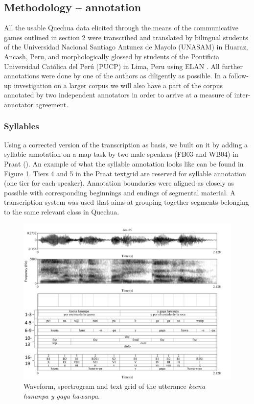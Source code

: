 \documentclass[output=paper]{LSP/langsci}
\begin{document}
\subsection{Methodology – annotation} 
All the usable Quechua data elicited through the means of the communicative games outlined in section 2 were transcribed and translated by bilingual students of the Universidad Nacional Santiago Antunez de Mayolo (UNASAM) in Huaraz, Ancash, Peru, and morphologically glossed by students of the Pontificia Universidad Católica del Perú (PUCP) in Lima, Peru using {ELAN} \citep{Wittenburg2006}. All further annotations were done by one of the authors as diligently as possible. In a follow-up investigation on a larger corpus we will also have a part of the corpus annotated by two independent annotators in order to arrive at a measure of inter-annotator agreement. 

\subsubsection{Syllables} 
Using a corrected version of the transcription as basis, we built on it by adding a syllabic annotation on a map-task by two male speakers (FB03 and WB04) in {Praat} (\citealt{Boersma.praat}). An example of what the syllable annotation looks like can be found in Figure \ref{fig:buc:1}. Tiers 4 and 5 in the {Praat} textgrid are reserved for syllable annotation (one tier for each speaker). Annotation boundaries were aligned as closely as possible with corresponding beginnings and endings of segmental material. A transcription system was used that aims at grouping together segments belonging to the same relevant class in Quechua. 

\begin{figure}  
\includegraphics[width=\textwidth]{figures/BUC-img1small_numbered.png}
\caption{Waveform, spectrogram and text grid of the utterance \textit{keena hananpa y gaga hawanpa}.}
\label{fig:buc:1}
\end{figure}
\end{document}
